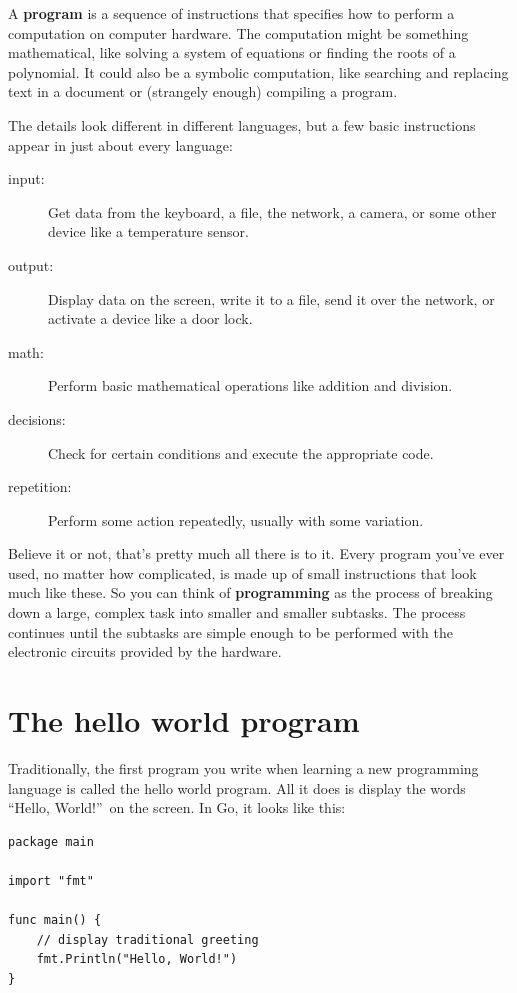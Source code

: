 
A {\bf program} is a sequence of instructions that specifies how to perform a computation on computer hardware.
The computation might be something mathematical, like solving a system of equations or finding the roots of a polynomial.
It could also be a symbolic computation, like searching and replacing text in a document or (strangely enough) compiling a program.

The details look different in different languages, but a few basic instructions appear in just about every language:

\begin{description}
\item[input:] Get data from the keyboard, a file, the network, a camera, or some other device like a temperature sensor.
\item[output:] Display data on the screen, write it to a file, send it over the network, or activate a device like a door lock.
\item[math:] Perform basic mathematical operations like addition and division.
\item[decisions:] Check for certain conditions and execute the appropriate code.
\item[repetition:] Perform some action repeatedly, usually with some variation.
\end{description}


Believe it or not, that's pretty much all there is to it.
Every program you've ever used, no matter how complicated, is made up of small instructions that look much like these.
So you can think of {\bf programming} as the process of breaking down a large, complex task into smaller and smaller subtasks.
The process continues until the subtasks are simple enough to be performed with the electronic circuits provided by the hardware.

\section{The hello world program}
\label{hello}

Traditionally, the first program you write when learning a new programming language is called the hello world program.
All it does is display the words ``Hello, World!''\ on the screen.
In Go, it looks like this:


\begin{lstlisting}
package main

import "fmt"

func main() {
	// display traditional greeting
	fmt.Println("Hello, World!") 
}
\end{lstlisting}

